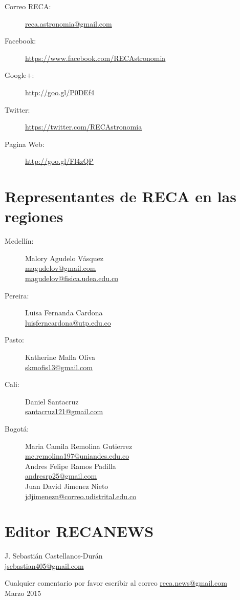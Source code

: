 \documentclass{book}
\begin{document}
\begin{description}
\item[Correo RECA:]\url{reca.astronomia@gmail.com}
\item[Facebook:] \url{https://www.facebook.com/RECAstronomia}
\item[Google$+$:] \url{http://goo.gl/P0DEf4}
\item[Twitter:] \url{https://twitter.com/RECAstronomia}
\item[Pagina Web:] \url{http://goo.gl/Fl4zQP}
\end{description}


\section*{Representantes de RECA en las regiones}
\begin{description}
\item[Medellín:]Malory Agudelo Vásquez\\
\url{magudelov@gmail.com}\\ \url{magudelov@fisica.udea.edu.co}
\item[Pereira:]Luisa Fernanda Cardona\\ \url{luisferncardona@utp.edu.co}
\item[Pasto:]Katherine Mafla Oliva\\
\url{skmofis13@gmail.com}
\item[Cali:]Daniel Santacruz\\
\url{santacruz121@gmail.com}
\item[Bogotá:]Maria Camila Remolina Gutierrez\\
\url{mc.remolina197@uniandes.edu.co}\\

Andres Felipe Ramos Padilla\\
\url{andresrp25@gmail.com}\\

Juan David Jimenez Nieto\\
\url{jdjimenezn@correo.udistrital.edu.co}
\end{description}


			\section*{Editor RECANEWS}
  
\begin{flushright}
J. Sebastián Castellanos-Durán\\
\url{jsebastian405@gmail.com}
\end{flushright}
\begin{flushright}
Cualquier comentario por favor escribir al correo  \url{reca.news@gmail.com}\\
Marzo 2015
\end{flushright}
\end{document}
